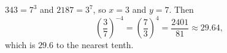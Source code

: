 $343=7^3$ and $2187=3^7$, so $x=3$ and $y=7$. Then
\[\left(\dfrac{3}{7}\right)^{-4}=\left(\dfrac{7}{3}\right)^4=\dfrac{2401}{81}\approx 29.64,\]
which is $\boxed{29.6}$ to the nearest tenth.
